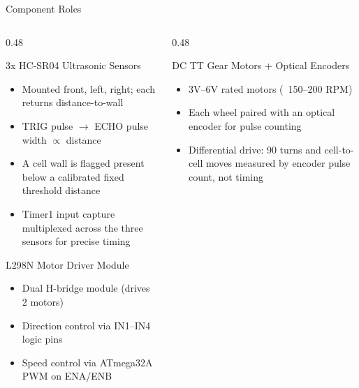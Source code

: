\documentclass[aspectratio=169,11pt]{beamer}
\begin{document}
\begin{frame}[t]{Component Roles}
    \scriptsize
    \begin{columns}[T]
        \begin{column}{0.48\textwidth}
            \begin{block}{3x HC-SR04 Ultrasonic Sensors}
                \begin{itemize}\setlength{\itemsep}{0pt}\setlength{\parskip}{0pt}
                    \item Mounted front, left, right; each returns distance-to-wall
                    \item TRIG pulse $\rightarrow$ ECHO pulse width $\propto$ distance
                    \item A cell wall is flagged present below a calibrated fixed threshold distance
                    \item Timer1 input capture multiplexed across the three sensors for precise timing
                \end{itemize}
            \end{block}

            \begin{block}{L298N Motor Driver Module}
                \begin{itemize}\setlength{\itemsep}{0pt}\setlength{\parskip}{0pt}
                    \item Dual H-bridge module (drives 2 motors)
                    \item Direction control via IN1--IN4 logic pins
                    \item Speed control via ATmega32A PWM on ENA/ENB
                \end{itemize}
            \end{block}
        \end{column}

        \begin{column}{0.48\textwidth}
            \begin{block}{DC TT Gear Motors + Optical Encoders}
                \begin{itemize}\setlength{\itemsep}{0pt}\setlength{\parskip}{0pt}
                    \item 3V--6V rated motors (~150--200 RPM)
                    \item Each wheel paired with an optical encoder for pulse counting
                    \item Differential drive: 90\textdegree{} turns and cell-to-cell moves measured by encoder pulse count, not timing
                \end{itemize}
            \end{block}


\end{column}
\end{columns}
\end{frame}
\end{document}
